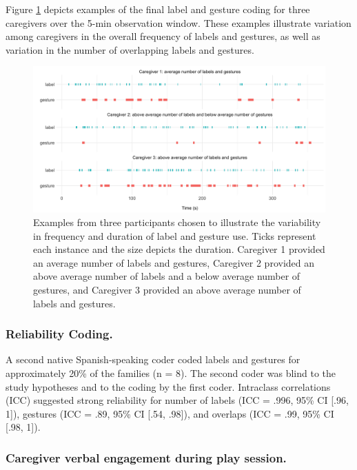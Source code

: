 \documentclass[
  english,
  man,floatsintext]{apa6}
\begin{document}
Figure \ref{fig:fig1} depicts examples of the final label and gesture coding for three caregivers over the 5-min observation window. These examples illustrate variation among caregivers in the overall frequency of labels and gestures, as well as variation in the number of overlapping labels and gestures.

\begin{figure}
\includegraphics[width=1\linewidth]{../stats/figures/fig.durations} \caption{Examples from three participants chosen to illustrate the variability in frequency and duration of label and gesture use.  Ticks represent each instance and the size depicts the duration.  Caregiver 1 provided an average number of labels and gestures, Caregiver 2 provided an above average number of labels and a below average number of gestures, and Caregiver 3 provided an above average number of labels and gestures.}\label{fig:fig1}
\end{figure}

\hypertarget{reliability-coding.}{%
\subsubsection{Reliability Coding.}\label{reliability-coding.}}

A second native Spanish-speaking coder coded labels and gestures for approximately 20\% of the families (n = 8). The second coder was blind to the study hypotheses and to the coding by the first coder. Intraclass correlations (ICC) suggested strong reliability for number of labels (ICC = .996, 95\% CI {[}.96, 1{]}), gestures (ICC = .89, 95\% CI {[}.54, .98{]}), and overlaps (ICC = .99, 95\% CI {[}.98, 1{]}).

\hypertarget{caregiver-verbal-engagement-during-play-session.}{%
\subsubsection{Caregiver verbal engagement during play session.}\label{caregiver-verbal-engagement-during-play-session.}}
\end{document}
